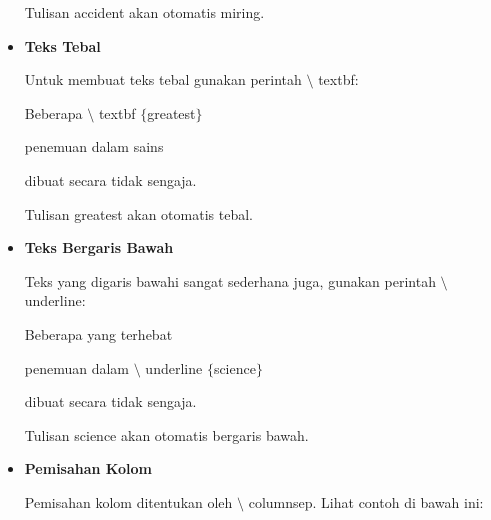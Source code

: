 \begin{itemize}
Tulisan accident akan otomatis miring.\par

\vspace{10pt}
	\item {\fontsize{14pt}{14pt}\selectfont \textbf{Teks Tebal}}\par

Untuk membuat teks tebal gunakan perintah $\setminus$ textbf:\par

\hspace*{0.5in}Beberapa $\setminus$ textbf $ \{ $greatest$ \} $\par

\hspace*{0.5in}penemuan dalam sains\par

\hspace*{0.5in}dibuat secara tidak sengaja.\par

Tulisan greatest akan otomatis tebal.\par

\vspace{10pt}
	\item {\fontsize{14pt}{14pt}\selectfont \textbf{Teks Bergaris Bawah}}\par

Teks yang digaris bawahi sangat sederhana juga, gunakan perintah $\setminus$ underline:\par

\hspace*{0.5in}Beberapa yang terhebat\par

\hspace*{0.5in}penemuan dalam $\setminus$ underline $ \{ $science$ \} $\par

\hspace*{0.5in}dibuat secara tidak sengaja.\par

Tulisan science akan otomatis bergaris bawah.\par

\vspace{10pt}
	\item {\fontsize{14pt}{14pt}\selectfont \textbf{Pemisahan Kolom}}\par

Pemisahan kolom ditentukan oleh $\setminus$ columnsep. Lihat contoh di bawah ini:\par


\end{itemize}
